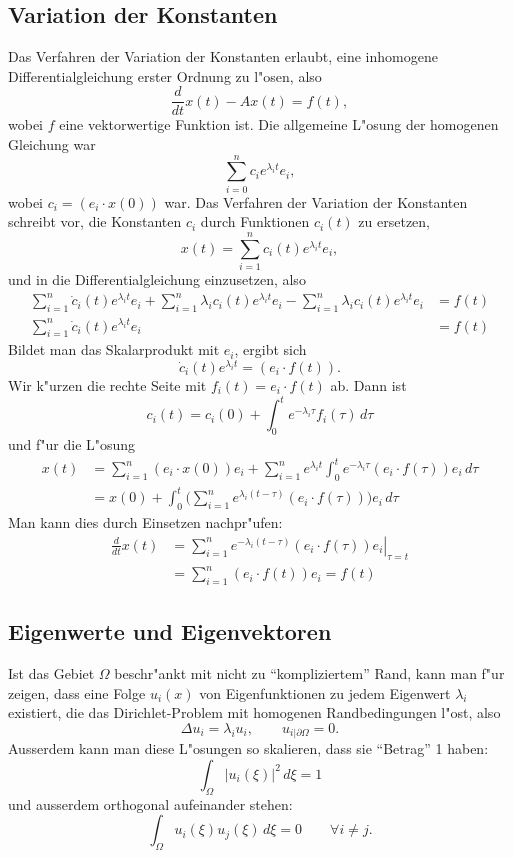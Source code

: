\subsection{Variation der Konstanten}
Das Verfahren der Variation der Konstanten erlaubt, eine inhomogene
Differentialgleichung erster Ordnung zu l"osen, also
$$\frac{d}{dt}x(t)-Ax(t)=f(t),$$
wobei $f$ eine vektorwertige Funktion ist.
Die allgemeine L"osung der homogenen Gleichung war
$$\sum_{i=0}^nc_ie^{\lambda_i t}e_i,$$
wobei $c_i=(e_i\cdot x(0))$ war.
Das Verfahren der Variation der Konstanten schreibt vor, die Konstanten
$c_i$ durch Funktionen $c_i(t)$ zu ersetzen,
$$
x(t)=\sum_{i=1}^nc_i(t)e^{\lambda_it}e_i,
$$
und in die Differentialgleichung
einzusetzen, also
\begin{align*}
\sum_{i=1}^n\dot c_i(t)e^{\lambda_it}e_i
+
\sum_{i=1}^n\lambda_i c_i(t)e^{\lambda_it}e_i
-\sum_{i=1}^n\lambda_i c_i(t)e^{\lambda_it}e_i
&=
f(t)
\\
\sum_{i=1}^n\dot c_i(t)e^{\lambda_it}e_i
&=
f(t)
\end{align*}
Bildet man das Skalarprodukt mit $e_i$, ergibt sich 
$$\dot c_i(t)e^{\lambda_i t}=(e_i\cdot f(t)).$$
Wir k"urzen die rechte Seite mit $f_i(t)=e_i\cdot f(t)$ ab.
Dann ist
$$c_i(t)=c_i(0)+\int_0^te^{-\lambda_i \tau}f_i(\tau)\,d\tau$$
und f"ur die L"osung
\begin{align*}
x(t)&=
\sum_{i=1}^n
(e_i\cdot x(0))e_i+
\sum_{i=1}^ne^{\lambda_i t}\int_0^te^{-\lambda_i \tau}(e_i\cdot f(\tau))e_i\,d\tau
\\
&=
x(0)
+
\int_0^t
\biggl(
\sum_{i=1}^n
e^{\lambda_i(t- \tau)}(e_i\cdot f(\tau))\biggr)e_i\,d\tau
\end{align*}
Man kann dies durch Einsetzen nachpr"ufen:
\begin{align*}
\frac{d}{dt}x(t)
&=
\sum_{i=1}^n\left.e^{-\lambda_i (t-\tau)}(e_i\cdot f(\tau))e_i \right|_{\tau=t}
\\
&=
\sum_{i=1}^n(e_i\cdot f(t))e_i=f(t)
\end{align*}

\subsection{Eigenwerte und Eigenvektoren}
Ist das Gebiet $\Omega$ beschr"ankt mit nicht zu ``kompliziertem'' Rand,
kann man f"ur zeigen, dass eine Folge $u_i(x)$
von Eigenfunktionen zu jedem Eigenwert $\lambda_i$ existiert,
die das Dirichlet-Problem mit homogenen
Randbedingungen l"ost, also
$$\Delta u_i=\lambda_iu_i,\qquad u_{i|\partial\Omega} = 0.$$
Ausserdem kann man diese L"osungen so skalieren, dass sie ``Betrag'' 1 haben:
$$\int_{\Omega}|u_i(\xi)|^2\,d\xi=1$$
und ausserdem orthogonal aufeinander stehen:
$$\int_{\Omega}u_i(\xi)u_j(\xi)\,d\xi=0\qquad\forall i\ne j.$$


